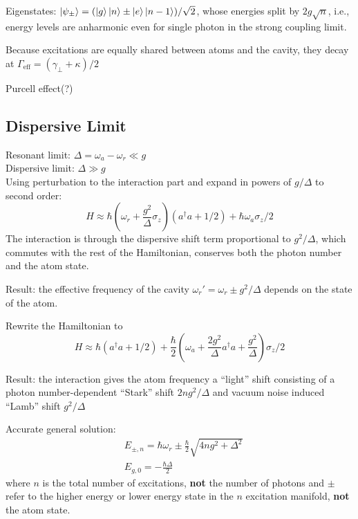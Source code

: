 \documentclass[8pt,a4paper,twocolumn]{article} %
\numberwithin{equation}{section} %
\begin{document}
		Eigenstates: $ \ket{\psi_{\pm} } = ( \ket g \ket n \pm \ket e \ket{n-1} )/\sqrt 2 $, whose energies split by $2g\sqrt n$, i.e., energy levels are anharmonic even for single photon in the strong coupling limit.

		Because excitations are equally shared between atoms and the cavity, they decay at $\Gamma_{\text{eff} }=(\gamma_{\perp}+\kappa)/2 $

		Purcell effect(?)

		\subsection{Dispersive Limit} %
		\label{sub:dispersive_limit}
			Resonant limit: $\Delta=\omega_a- \omega_r \ll g $\\
			Dispersive limit: $\Delta\gg g$\\
			Using perturbation to the interaction part and expand in powers of $g/\Delta $ to second order:
			\begin{equation}
				H\approx \hbar \left( \omega_r +\frac{g^2}{\Delta} \sigma_z \right) (a^{\dagger}a+1/2)+\hbar \omega_a \sigma_z /2
			\end{equation}
			The interaction is through the dispersive shift term proportional to $g^2/\Delta$, which commutes with the rest of the Hamiltonian, conserves both the photon number and the atom state.

			Result: the effective frequency of the cavity $ \omega_r'=\omega_r\pm g^2/\Delta $ depends on the state of the atom.

			Rewrite the Hamiltonian to
			\begin{equation}
				H\approx \hbar(a^{\dagger}a+1/2) +\frac{\hbar}{2} \left( \omega_a +\frac{2g^2}{\Delta}a^{\dagger}a + \frac{g^2}{\Delta}\right) \sigma_z /2
			\end{equation}

			Result: the interaction gives the atom frequency a ``light'' shift consisting of a photon number-dependent ``Stark'' shift $ 2ng^2/\Delta $ and vacuum noise induced ``Lamb'' shift $g^2/\Delta $

			Accurate general solution:
			\begin{align}
				&E_{\pm,n}=\hbar \omega_r\pm \frac{\hbar}{2} \sqrt{4ng^2+\Delta^2}\\
				&E_{g,0}=-\frac{\hbar \Delta}{2}
			\end{align}
			where $n$ is the total number of excitations, \textbf{not} the number of photons and $\pm$ refer to the higher energy or lower energy state in the $n$ excitation manifold, \textbf{not} the atom state.
\end{document}
